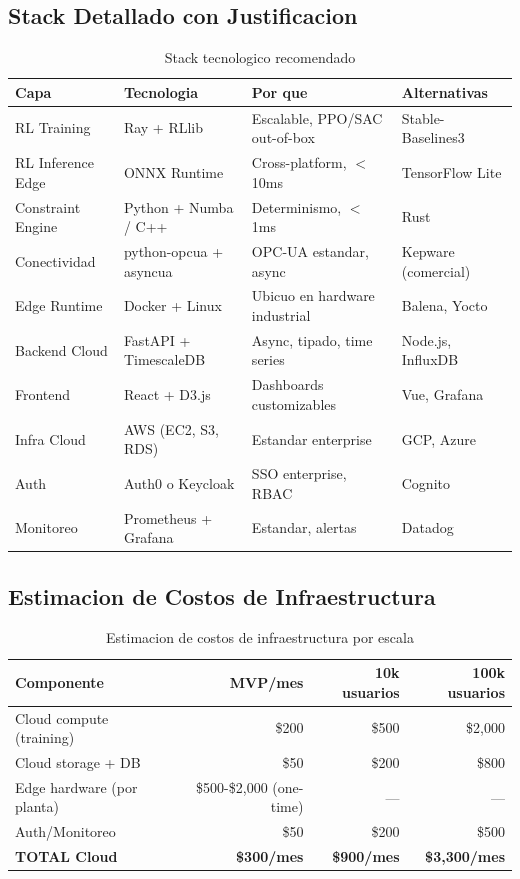 \documentclass[11pt,a4paper]{article}
\begin{document}
\subsection{Stack Detallado con Justificacion}

\begin{table}[h]
\centering
\small
\begin{tabular}{p{2.5cm} p{3cm} p{4.5cm} p{3cm}}
\toprule
\textbf{Capa} & \textbf{Tecnologia} & \textbf{Por que} & \textbf{Alternativas} \\
\midrule
RL Training & Ray + RLlib & Escalable, PPO/SAC out-of-box & Stable-Baselines3 \\
RL Inference Edge & ONNX Runtime & Cross-platform, $<$10ms & TensorFlow Lite \\
Constraint Engine & Python + Numba / C++ & Determinismo, $<$1ms & Rust \\
Conectividad & python-opcua + asyncua & OPC-UA estandar, async & Kepware (comercial) \\
Edge Runtime & Docker + Linux & Ubicuo en hardware industrial & Balena, Yocto \\
Backend Cloud & FastAPI + TimescaleDB & Async, tipado, time series & Node.js, InfluxDB \\
Frontend & React + D3.js & Dashboards customizables & Vue, Grafana \\
Infra Cloud & AWS (EC2, S3, RDS) & Estandar enterprise & GCP, Azure \\
Auth & Auth0 o Keycloak & SSO enterprise, RBAC & Cognito \\
Monitoreo & Prometheus + Grafana & Estandar, alertas & Datadog \\
\bottomrule
\end{tabular}
\caption{Stack tecnologico recomendado}
\end{table}

\subsection{Estimacion de Costos de Infraestructura}

\begin{table}[h]
\centering
\begin{tabular}{l r r r}
\toprule
\textbf{Componente} & \textbf{MVP/mes} & \textbf{10k usuarios} & \textbf{100k usuarios} \\
\midrule
Cloud compute (training) & \$200 & \$500 & \$2,000 \\
Cloud storage + DB & \$50 & \$200 & \$800 \\
Edge hardware (por planta) & \$500-\$2,000 (one-time) & --- & --- \\
Auth/Monitoreo & \$50 & \$200 & \$500 \\
\midrule
\textbf{TOTAL Cloud} & \textbf{\$300/mes} & \textbf{\$900/mes} & \textbf{\$3,300/mes} \\
\bottomrule
\end{tabular}
\caption{Estimacion de costos de infraestructura por escala}
\end{table}
\end{document}
